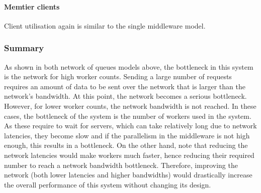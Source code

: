 \documentclass[11pt,a4paper]{article}
\begin{document}
\paragraph{Memtier clients}
Client utilisation again is similar to the single middleware model.

\subsubsection{Summary}
As shown in both network of queues models above, the bottleneck in this system is the network for high worker counts. Sending a large number of requests requires an amount of data to be sent over the network that is larger than the network's bandwidth. At this point, the network becomes a serious bottleneck. However, for lower worker counts, the network bandwidth is not reached. In these cases, the bottleneck of the system is the number of workers used in the system. As these require to wait for servers, which can take relatively long due to network latencies, they become slow and if the parallelism in the middleware is not high enough, this results in a bottleneck. On the other hand, note that reducing the network latencies would make workers much faster, hence reducing their required number to reach a network bandwidth bottleneck. Therefore, improving the network (both lower latencies and higher bandwidths) would drastically increase the overall performance of this system without changing its design.
\end{document}
